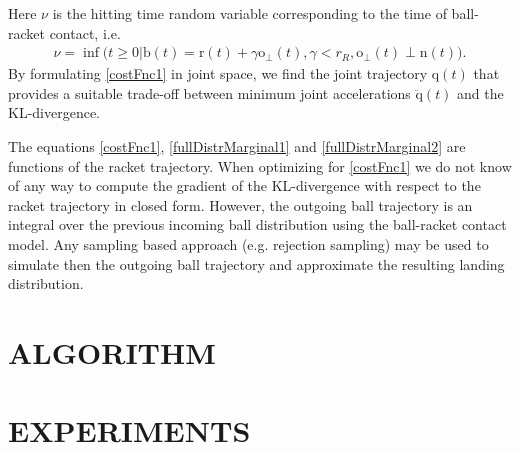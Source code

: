 \documentclass[letterpaper, 10 pt, conference]{ieeeconf}
\newcommand{\boldvec}[1]{\boldsymbol{\mathrm{#1}}}
\let\vec\boldvec
\newcommand{\joint}{\vec{q}} %
\newcommand{\ball}{\vec{b}} %
\newcommand{\racket}{\vec{r}} %
\newcommand{\racketRadius}{r_R} %
\newcommand{\orient}{\vec{o}} %
\newcommand{\normal}{\vec{n}} %
\newcommand{\prob}{\mathbb{P}} %
\newcommand{\hitTime}{\nu} %
\newcommand{\hitEvent}{\mathcal{H}}
\newcommand{\hitDist}{p(\nu)} %
\begin{document}
%
\noindent Here $\hitTime$ is the hitting time random variable corresponding to the time of ball-racket contact, i.e. 
%
\begin{align}
\hitTime = \inf\big(t \geq 0 | \ball(t) = \racket(t) + \gamma \orient_{\perp}(t), \gamma < \racketRadius, \orient_{\perp}(t) \perp \normal(t)).
\label{hitTime}
\end{align}
%
By formulating \eqref{costFnc1} in joint space, we find the joint trajectory $\joint(t)$ that provides a suitable trade-off between minimum joint accelerations $\ddot{\joint}(t)$ and the KL-divergence. 

% 

%
%
%

The equations \eqref{costFnc1}, \eqref{fullDistrMarginal1} and \eqref{fullDistrMarginal2} are functions of the racket trajectory. When optimizing for \eqref{costFnc1} we do not know of any way to compute the gradient of the KL-divergence with respect to the racket trajectory in closed form. However, the outgoing ball trajectory is an integral over the previous incoming ball distribution using the ball-racket contact model. Any sampling based approach (e.g. rejection sampling) may be used to simulate then the outgoing ball trajectory and approximate the resulting landing distribution. 


\section{ALGORITHM}\label{alg}

\section{EXPERIMENTS}\label{results}
\end{document}
